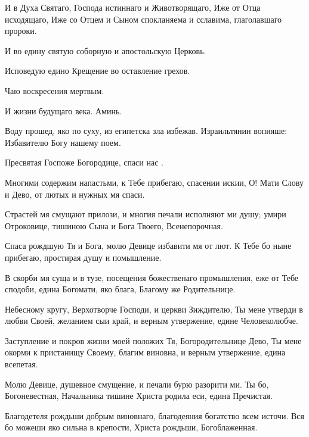 \begin{mymulticols}
И в Духа Святаго, Господа истиннаго и Животворящаго, Иже от Отца исходящаго, Иже со Отцем и Сыном спокланяема и сславима, глаголавшаго пророки.

И во едину святую соборную и апостольскую Церковь.

Исповедую едино Крещение во оставление грехов.

Чаю воскресения мертвым.

И жизни будущаго века. Аминь.





 Воду прошед, яко по суху, из египетска зла избежав. Израильтянин вопияше: Избавителю Богу нашему поем.


 Пресвятая Госпоже Богородице, спаси нас .

Многими содержим напастьми, к Тебе прибегаю, спасении искии, О! Мати Слову и Дево, от лютых и нужных мя спаси.




Страстей мя смущают прилози, и многия печали исполняют ми душу; умири Отроковице, тишиною Сына и Бога Твоего, Всенепорочная.


 Спаса рождшую Тя и Бога, молю Девице избавити мя от лют. К Тебе бо ныне прибегаю, простирая душу и помышление.

 В скорби мя суща и в тузе, посещения божественаго промышления, еже от Тебе сподоби, едина Богомати, яко блага, Благому же Родительнице.



 Небесному кругу, Верхотворче Господи, и церкви Зиждителю, Ты мене утверди в любви Своей, желанием сыи край, и верным утвержение, едине Человеколюбче.




Заступление и покров жизни моей положих Тя, Богородительнице Дево, Ты мене окорми к пристанищу Своему, благим виновна, и верным утвержение, едина всепетая.




Молю Девице, душевное смущение, и печали бурю разорити ми. Ты бо, Богоневестная, Начальника тишине Христа родила еси, едина Пречистая.


 Благодетеля рождьши добрым виновнаго, благодеяния богатство всем источи. Вся бо можеши яко сильна в крепости, Христа рождьши, Богоблаженная.


\end{mymulticols}
